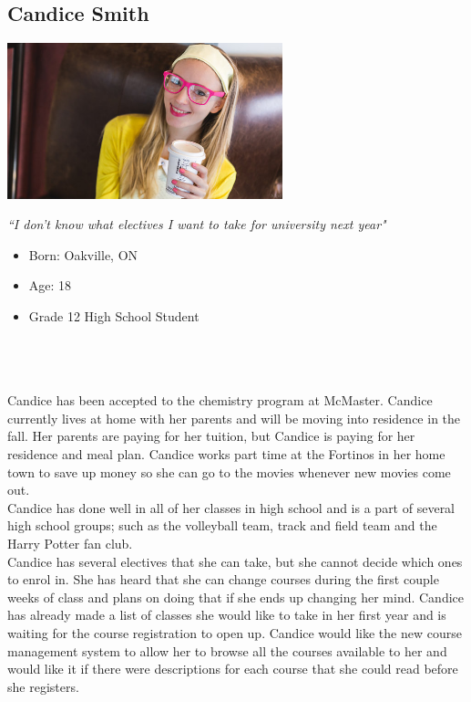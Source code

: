 \documentclass[10pt]{article}
\begin{document}
\subsection*{Candice Smith}
\vspace{4mm}

\begin{minipage}{80mm}
\includegraphics[width=80mm]{Candice.jpg}
\begin{center}
\emph{``I don't know what electives I want to take for university next year"}
\end{center}
\end{minipage} \hfill
\begin{minipage}{\textwidth}
\begin{itemize}
\item Born: Oakville, ON
\item Age: 18
\item Grade 12 High School Student
\end{itemize}
\end{minipage}\\\\\\


Candice has been accepted to the chemistry program at McMaster. Candice currently lives at home with her parents and will be moving into residence in the fall. Her parents are paying for her tuition, but Candice is paying for her residence and meal plan. Candice works part time at the Fortinos in her home town to save up money so she can go to the movies whenever new movies come out.\\

Candice has done well in all of her classes in high school and is a part of several high school groups; such as the volleyball team, track and field team and the Harry Potter fan club.\\

Candice has several electives that she can take, but she cannot decide which ones to enrol in. She has heard that she can change courses during the first couple weeks of class and plans on doing that if she ends up changing her mind. Candice has already made a list of classes she would like to take in her first year and is waiting for the course registration to open up. Candice would like the new course management system to allow her to browse all the courses available to her and would like it if there were descriptions for each course that she could read before she registers.
\end{document}
